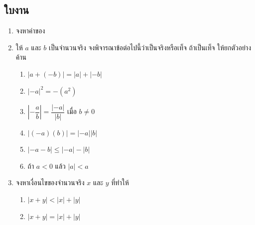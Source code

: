 \newpage
\subsection*{ใบงาน}
\begin{enumerate}[label=\arabic*., leftmargin=*]
	\item จงหาค่าของ
	\begin{enumerate}[label=\theenumi\arabic*), leftmargin=*]
	\end{enumerate}
	
	\item ให้ $a$ และ $b$ เป็นจำนวนจริง จงพิจารณาข้อต่อไปนี้ว่าเป็นจริงหรือเท็จ ถ้าเป็นเท็จ ให้ยกตัวอย่างค้าน
	\begin{enumerate}[label=\theenumi\arabic*), leftmargin=*]
		\item $|a+(-b)|=|a|+|-b|$
		\item $|-a|^2=-\left(a^2\right)$
		\item $\left|-\dfrac{a}{b}\right|=\dfrac{|-a|}{|b|}$ เมื่อ $b \neq 0$
		\item $|(-a)(b)|=|-a||b|$
		\item $|-a-b| \leq|-a|-|b|$
		\item ถ้า $a<0$ แล้ว $|a|<a$
	\end{enumerate}
	
	\item จงหาเงื่อนไขของจำนวนจริง $x$ และ $y$ ที่ทำให้
	\begin{enumerate}[label=\theenumi\arabic*), leftmargin=*]
		\item $|x+y|<|x|+|y|$
		\item $|x+y|=|x|+|y|$
	\end{enumerate}
\end{enumerate}

